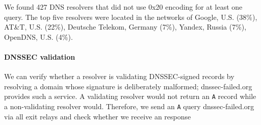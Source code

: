 We found 427 DNS resolvers that did not use 0x20 encoding for at least one
query.  The top five resolvers were located in the networks of Google, U.S.
(38\%), AT\&T, U.S. (22\%), Deutsche Telekom, Germany (7\%), Yandex, Russia
(7\%), OpenDNS, U.S. (4\%).

\paragraph{DNSSEC validation}
We can verify whether a resolver is validating DNSSEC-signed records by resolving a
domain whose signature is deliberately malformed; 
dnssec-failed.org provides such a service.  A validating resolver
would not return an {\tt A} record while
a non-validating resolver would.  Therefore, we send an {\tt A} query dnssec-failed.org via
all exit relays and check whether we receive an response
\fi
